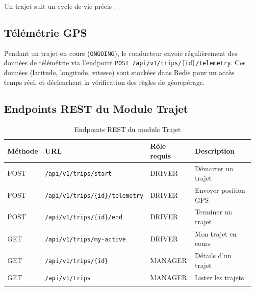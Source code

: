 \documentclass[12pt,a4paper]{report}
\begin{document}
Un trajet suit un cycle de vie précis :

\begin{center}
\end{center}

\subsection{Télémétrie GPS}

Pendant un trajet en cours (\texttt{ONGOING}), le conducteur envoie régulièrement des données de télémétrie via l'endpoint \texttt{POST /api/v1/trips/\{id\}/telemetry}. Ces données (latitude, longitude, vitesse) sont stockées dans Redis pour un accès temps réel, et déclenchent la vérification des règles de géorepérage.

\subsection{Endpoints REST du Module Trajet}

\begin{longtable}{p{1.5cm}p{5.5cm}p{2.5cm}p{3cm}}
\toprule
\textbf{Méthode} & \textbf{URL} & \textbf{Rôle requis} & \textbf{Description} \\
\midrule
\endhead
POST & \texttt{/api/v1/trips/start} & DRIVER & Démarrer un trajet \\
POST & \texttt{/api/v1/trips/\{id\}/telemetry} & DRIVER & Envoyer position GPS \\
POST & \texttt{/api/v1/trips/\{id\}/end} & DRIVER & Terminer un trajet \\
GET & \texttt{/api/v1/trips/my-active} & DRIVER & Mon trajet en cours \\
GET & \texttt{/api/v1/trips/\{id\}} & MANAGER & Détails d'un trajet \\
GET & \texttt{/api/v1/trips} & MANAGER & Lister les trajets \\
\bottomrule
\caption{Endpoints REST du module Trajet}
\end{longtable}
\end{document}
